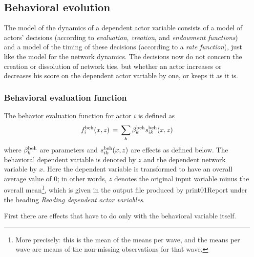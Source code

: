 \documentclass[a4paper,fleqn,11pt]{article}
\newcommand{\+}{\, + \,}
\newcommand{\sfn}[1]{\textsf{#1}}
\begin{document}
\subsection{Behavioral evolution}
\label{S_ff_b}

The model of the dynamics of a dependent actor variable
consists of a model of actors' decisions (according to {\it
evaluation}, {\it creation}, and {\it endowment functions})
and a model of the timing
of these decisions (according to a {\it rate function}),
just like the model for the network dynamics. The
decisions now do not concern the creation or dissolution of
network ties, but whether an actor increases or decreases his
score on the dependent actor variable by one, or keeps it as it
is.

\subsubsection{Behavioral evaluation function}
\label{S_f_b}

The behavior evaluation function for actor $i$ is defined as
\begin{equation}
f^{\rm beh}_i(x, z) \, = \, \sum_k \beta^{\rm beh}_k s^{\rm beh}_{ik}(x, z)
                                             \label{f_beh}
\end{equation}
where $\beta^{\rm beh}_k$ are parameters and $s^{\rm beh}_{ik}(x, z)$
are effects as defined below.
The behavioral dependent variable is denoted by $z$ and the
dependent network variable by $x$.
Here the dependent variable is transformed
to have an overall average value of 0;
in other words, $z$ denotes the original input variable
minus the overall mean\footnote{More precisely: \label{meandef}
this is the mean of the means per wave, and the
means per wave are means of the non-missing observations
for that wave.}, which is given in the
output file produced by \sfn{print01Report} under the heading
\emph{Reading dependent actor variables}.

First there are effects that have to do only
with the behavioral variable itself.
\end{document}
